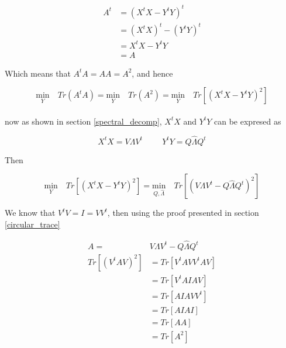 \documentclass{article}
\begin{document}
    \begin{equation*}
        \begin{aligned}
            A^t &= (X^tX - Y^tY)^t\\
                &= (X^tX)^t - (Y^tY)^t\\
                &= X^tX - Y^tY\\
                &= A
        \end{aligned}
    \end{equation*}

    Which means that $A^tA = AA = A^2$, and hence

    \begin{equation*}
        \underset{Y}{\text{min}} \quad Tr(A^tA)
        =
        \underset{Y}{\text{min}} \quad Tr(A^2)
        =
        \underset{Y}{\text{min}} \quad Tr[(X^tX - Y^tY)^2]
    \end{equation*}\\

    now as shown in section \ref{spectral_decomp}, $X^tX$ and $Y^tY$ can be
    expresed as

    \begin{equation*}
        X^tX = V\Lambda V^t \hspace{1cm} Y^tY = Q \hat{\Lambda} Q^t
    \end{equation*}

    Then

    \begin{equation*}
        \underset{Y}{\text{min}} \quad Tr[(X^tX - Y^tY)^2]
        =
        \underset{Q,\hat{\Lambda}}{\text{min}} \quad Tr[(V\Lambda V^t - Q \hat{\Lambda} Q^t)^2]
    \end{equation*}

    We know that $V^tV = I = VV^t$, then using the proof presented in section \ref{circular_trace}

    \begin{equation*}
        \begin{aligned}
            A =& V\Lambda V^t - Q \hat{\Lambda} Q^t\\
            Tr[(V^tAV)^2] &= Tr[V^tAVV^tAV]\\
                          &= Tr[V^tAIAV]\\
                          &= Tr[AIAVV^t]\\
                          &= Tr[AIAI]\\
                          &= Tr[AA]\\
                          &= Tr[A^2]\\
        \end{aligned}
    \end{equation*}\\
\end{document}

